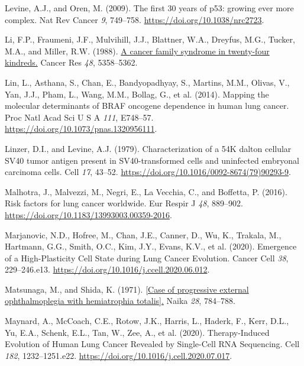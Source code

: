 \begin{CSLReferences}{0}{0}
\leavevmode{}%
Levine, A.J., and Oren, M. (2009). The first 30 years of p53: growing ever more complex. Nat Rev Cancer \emph{9}, 749--758. \url{https://doi.org/10.1038/nrc2723}.

\leavevmode{}%
Li, F.P., Fraumeni, J.F., Mulvihill, J.J., Blattner, W.A., Dreyfus, M.G., Tucker, M.A., and Miller, R.W. (1988). \href{https://www.ncbi.nlm.nih.gov/pubmed/3409256}{A cancer family syndrome in twenty-four kindreds.} Cancer Res \emph{48}, 5358--5362.

\leavevmode{}%
Lin, L., Asthana, S., Chan, E., Bandyopadhyay, S., Martins, M.M., Olivas, V., Yan, J.J., Pham, L., Wang, M.M., Bollag, G., et al. (2014). Mapping the molecular determinants of BRAF oncogene dependence in human lung cancer. Proc Natl Acad Sci U S A \emph{111}, E748--57. \url{https://doi.org/10.1073/pnas.1320956111}.

\leavevmode{}%
Linzer, D.I., and Levine, A.J. (1979). Characterization of a 54K dalton cellular SV40 tumor antigen present in SV40-transformed cells and uninfected embryonal carcinoma cells. Cell \emph{17}, 43--52. \url{https://doi.org/10.1016/0092-8674(79)90293-9}.

\leavevmode{}%
Malhotra, J., Malvezzi, M., Negri, E., La Vecchia, C., and Boffetta, P. (2016). Risk factors for lung cancer worldwide. Eur Respir J \emph{48}, 889--902. \url{https://doi.org/10.1183/13993003.00359-2016}.

\leavevmode{}%
Marjanovic, N.D., Hofree, M., Chan, J.E., Canner, D., Wu, K., Trakala, M., Hartmann, G.G., Smith, O.C., Kim, J.Y., Evans, K.V., et al. (2020). Emergence of a High-Plasticity Cell State during Lung Cancer Evolution. Cancer Cell \emph{38}, 229--246.e13. \url{https://doi.org/10.1016/j.ccell.2020.06.012}.

\leavevmode{}%
Matsunaga, M., and Shida, K. (1971). \href{https://www.ncbi.nlm.nih.gov/pubmed/5130083}{{[}Case of progressive external ophthalmoplegia with hemiatrophia totalis{]}.} Naika \emph{28}, 784--788.

\leavevmode{}%
Maynard, A., McCoach, C.E., Rotow, J.K., Harris, L., Haderk, F., Kerr, D.L., Yu, E.A., Schenk, E.L., Tan, W., Zee, A., et al. (2020). Therapy-Induced Evolution of Human Lung Cancer Revealed by Single-Cell RNA Sequencing. Cell \emph{182}, 1232--1251.e22. \url{https://doi.org/10.1016/j.cell.2020.07.017}.


\end{CSLReferences}
